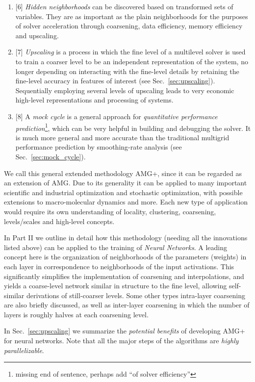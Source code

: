 \documentclass{article} %
\begin{document}
\begin{enumerate}
    \item{[6]} {\it Hidden neighborhoods} can be discovered based on transformed sets of variables. They are as important as the plain neighborhoods for the purposes of solver acceleration through coarsening, data efficiency, memory efficiency and upscaling. 
    \item{[7]} {\it Upscaling} is a process in which the fine level of a multilevel solver is used to train a coarser level to be an independent representation of the system, no longer depending on interacting with the fine-level details by retaining the fine-level accuracy in features of interest (see Sec.~\ref{sec:upscaling}). Sequentially employing several levels of upscaling leads to very economic high-level representations and processing of systems.
    \item{[8]} A {\it mock cycle} is a general approach for {\it quantitative performance prediction}\footnote{missing end of sentence, perhaps add ``of solver efficiency''}, which can be very helpful in building and debugging the solver. It is much more general and more accurate than the traditional multigrid performance prediction by smoothing-rate analysis (see Sec.~\ref{sec:mock_cycle}). 
\end{enumerate}
We call this general extended methodology AMG+, since it can be regarded as an extension of AMG. Due to its generality it can be applied to many important scientific and industrial optimization and stochastic optimization, with possible extensions to macro-molecular dynamics and more. Each new type of application would require its own understanding of locality, clustering, coarsening, levels/scales and high-level concepts.

In Part II we outline in detail how this methodology (needing all the innovations listed above) can be applied to the training of {\it Neural Networks}. A leading concept here is the organization of neighborhoods of the parameters (weights) in each layer in correspondence to neighborhoods of the input activations. This significantly simplifies the implementation of coarsening and interpolations, and yields a coarse-level network similar in structure to the fine level, allowing self-similar derivations of still-coarser levels. Some other types intra-layer coarsening are also briefly discussed, as well as inter-layer coarsening in which the number of layers is roughly halves at each coarsening level.

In Sec.~\ref{sec:upscaling} we summarize the {\it potential benefits} of developing AMG+ for neural networks. Note that all the major steps of the algorithms are {\it highly parallelizable}.
\end{document}
